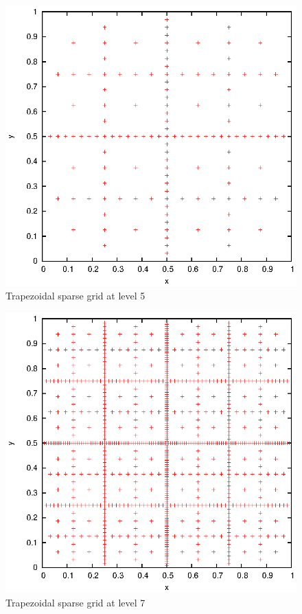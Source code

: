 \documentclass[]{article}
\begin{document}
\begin{figure}[!ht]
\centering
\includegraphics[width=.9\textwidth]{task11_trap_5}
\caption{Trapezoidal sparse grid at level 5}
\label{fig:Task11c}
\end{figure}

\begin{figure}[!ht]
\centering
\includegraphics[width=.9\textwidth]{task11_trap_7}
\caption{Trapezoidal sparse grid at level 7}
\label{fig:Task11d}
\end{figure}
\clearpage
\end{document}
